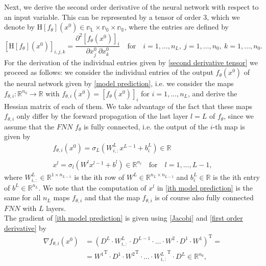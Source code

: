 Next, we derive the second order derivative of the neural network with respect to an input variable. This can be represented by a tensor of order 3, which we denote by $\mathrm{H} \left[f_{\theta} \right]\left(x^0\right) \in \mathbb{n_L \times n_0 \times n_0}$, where the entries are defined by
\begin{equation}
    \label{second derivative tensor}
    \left[ \mathrm{H} \left[f_{\theta} \right]\left(x^0\right) \right]_{i,j,k} = \frac{\partial^2 \left[f_{\theta}\left(x^0\right)\right]_i}{\partial x^0_{j} \ \partial x^0_{k}} \quad \text{for} \quad i = 1,\ldots, n_L, \ j = 1,\ldots, n_0, \ k = 1,\ldots, n_0.
\end{equation}
For the derivation of the individual entries given by \cref{second derivative tensor} we proceed as follows: we consider the individual entries of the output $f_{\theta}\left(x^0\right)$ of the neural network given by \cref{model prediction}, i.e. we consider the maps $f_{\theta, i} \colon \mathbb{R}^{n_0} \to \mathbb{R}$ with $f_{\theta, i} \left( x^0 \right) = \left[ f_{\theta} (x^0) \right]_i$ for $i = 1, \ldots, n_L$, and derive the Hessian matrix of each of them. We take advantage of the fact that these maps $f_{\theta, i}$ only differ by the forward propagation of the last layer $l = L$ of $f_{\theta}$, since we assume that the $FNN$ $f_{\theta}$ is fully connected, i.e. the output of the $i$-th map is given by 
\begin{gather}
    \label{ith model prediction}
    f_{\theta, i} (x^0) = \sigma_L\left(W^L_{i,:} x^{L-1}  + b^{L}_{i} \right) \in \mathbb{R} \\
    \\
    x^l = \sigma_l\left(W^l x^{l-1} + b^l\right) \in \mathbb{R}^{n_l} \quad \text{for} \quad l = 1, \ldots, L-1,
\end{gather}
where $W^L_{i,:} \in \mathbb{R}^{1 \times n_{L-1}}$ is the ith row of $W^L \in \mathbb{R}^{n_L \times n_{L-1}}$ and $b^{L}_{i} \in \mathbb{R}$ is the ith entry of $b^{L} \in \mathbb{R}^{n_L}$. We note that the computation of $x^l$ in \cref{ith model prediction} is the same for all $n_L$ maps $f_{\theta, i}$ and that the map $f_{\theta, i}$ is of course also fully connected $FNN$ with $L$ layers. \\
The gradient of \cref{ith model prediction} is given using \cref{Jacobi} and \cref{first order derivative} by
\begin{align}
    \label{ith first order derivative}
    \nabla f_{\theta, i} \left(x^0\right) & = \left( D^L \cdot W^L_{i,:} \cdot D^{L-1} \cdot \ldots \cdot W^2 \cdot D^1 \cdot W^{1} \right)^{\mathrm{T}} = \\
    & = {W^{1}}^{\mathrm{T}} \cdot D^{1} \cdot {W^{2}}^{\mathrm{T}} \cdot \ldots \cdot {W^L_{i,:}}^{\mathrm{T}}  \cdot  D^{L} \in \mathbb{R}^{n_0}, 
\end{align}
